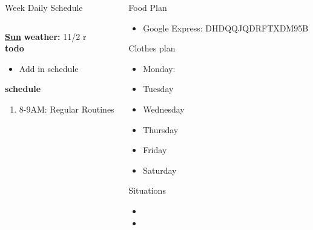 \begin{columns}
\begin{column}{0.6\linewidth}
\begin{block}{Week Daily Schedule}
\begin{columns}
          \begin{column}{0.15\textwidth}{\small \underline{\bf Sun}}
            {\tiny {\bf weather:} } {\tiny 11/2 r} \\ 
            {\tiny {\bf todo}}\\
            \begin{itemize}
              \tiny \item \tiny Add in schedule
            \end{itemize} 
                {\tiny \bf schedule}\\
                \begin{enumerate} 
                  \tiny \item \tiny 8-9AM: Regular Routines 
                \end{enumerate}
          \end{column}
        \end{columns}
      \end{block}
\end{column}
    
    \begin{column}{0.20\linewidth}
      \begin{block}{Food Plan} 
        \begin{itemize}
          \tiny \item \tiny Google Express: DHDQQJQDRFTXDM95B
        \end{itemize}
      \end{block} 
      \begin{block}{Clothes plan} 
        \begin{itemize}
          \tiny \item \tiny Monday: 
        \item \tiny Tuesday
        \item \tiny Wednesday
        \item \tiny Thursday
        \item \tiny Friday
        \item \tiny Saturday
        \end{itemize} 
      \end{block} 
      
      \begin{block}{Situations}
        \begin{itemize}
          \tiny \item \tiny 
        \item \tiny 
        \end{itemize}
      \end{block}
    \end{column}
\end{columns}

